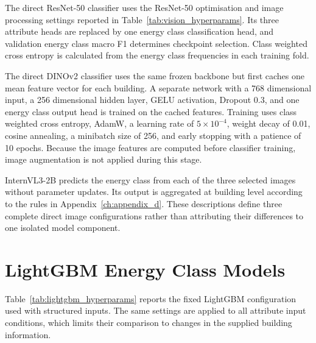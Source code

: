 The direct ResNet-50 classifier uses the ResNet-50 optimisation and image processing settings reported in Table~\ref{tab:vision_hyperparams}.
Its three attribute heads are replaced by one energy class classification head, and validation energy class macro F1 determines checkpoint selection.
Class weighted cross entropy is calculated from the energy class frequencies in each training fold.

The direct DINOv2 classifier uses the same frozen backbone but first caches one mean feature vector for each building.
A separate network with a 768 dimensional input, a 256 dimensional hidden layer, GELU activation, Dropout 0.3, and one energy class output head is trained on the cached features.
Training uses class weighted cross entropy, AdamW, a learning rate of \(5\times10^{-4}\), weight decay of 0.01, cosine annealing, a minibatch size of 256, and early stopping with a patience of 10 epochs.
Because the image features are computed before classifier training, image augmentation is not applied during this stage.

InternVL3-2B predicts the energy class from each of the three selected images without parameter updates.
Its output is aggregated at building level according to the rules in Appendix~\ref{ch:appendix_d}.
These descriptions define three complete direct image configurations rather than attributing their differences to one isolated model component.

\section{LightGBM Energy Class Models}
\label{sec:appendix_b_lightgbm}

Table~\ref{tab:lightgbm_hyperparams} reports the fixed \acs{LightGBM} configuration used with structured inputs.
The same settings are applied to all attribute input conditions, which limits their comparison to changes in the supplied building information.


